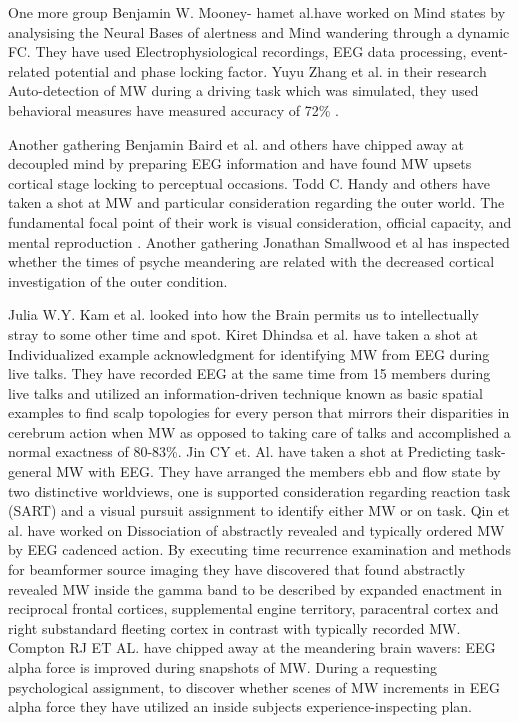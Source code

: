 One more group Benjamin W. Mooney- hamet al.have worked on Mind states by analysising the Neural Bases of alertness and Mind wandering through a dynamic FC. They have used Electrophysiological recordings, EEG data processing, event-related potential and phase locking factor. Yuyu Zhang et al. in their research Auto-detection of MW during a driving task which was simulated, they used behavioral measures have measured accuracy of 72\% .

Another gathering Benjamin Baird et al.  and others have chipped away at decoupled mind by preparing EEG information and have found MW upsets cortical stage locking to perceptual occasions. Todd C. Handy and others have taken a shot at MW and particular consideration regarding the outer world. The fundamental focal point of their work is visual consideration, official capacity, and mental reproduction . Another gathering Jonathan Smallwood et al  has inspected whether the times of psyche meandering are related with the decreased cortical investigation of the outer condition. 

Julia W.Y. Kam et al. looked into how the Brain permits us to intellectually stray to some other time and spot. Kiret Dhindsa et al.  have taken a shot at Individualized example acknowledgment for identifying MW from EEG during live talks. They have recorded EEG at the same time from 15 members during live talks and utilized an information-driven technique known as basic spatial examples to find scalp topologies for every person that mirrors their disparities in cerebrum action when MW as opposed to taking care of talks and accomplished a normal exactness of 80-83\%. Jin CY et. Al.  have taken a shot at Predicting task-general MW with EEG. They have arranged the members ebb and flow state by two distinctive worldviews, one is supported consideration regarding reaction task (SART) and a visual pursuit assignment to identify either MW or on task. Qin et al.  have worked on Dissociation of abstractly revealed and typically ordered MW by EEG cadenced action. By executing time recurrence examination and methods for beamformer source imaging they have discovered that found abstractly revealed MW inside the gamma band to be described by expanded enactment in reciprocal frontal cortices, supplemental engine territory, paracentral cortex and right substandard fleeting cortex in contrast with typically recorded MW. Compton RJ ET AL.  have chipped away at the meandering brain wavers: EEG alpha force is improved during snapshots of MW. During a requesting psychological assignment, to discover whether scenes of MW increments in EEG alpha force they have utilized an inside subjects experience-inspecting plan.

